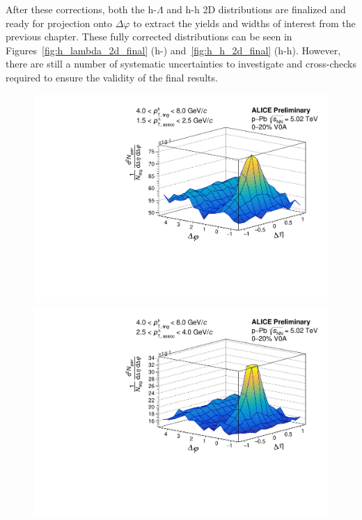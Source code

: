 After these corrections, both the h-$\Lambda$ and h-h 2D distributions are finalized and ready for projection onto $\Delta\varphi$ to extract the yields and widths of interest from the previous chapter. These fully corrected distributions can be seen in Figures~\ref{fig:h_lambda_2d_final} (h-\lmb) and~\ref{fig:h_h_2d_final} (h-h). However, there are still a number of systematic uncertainties to investigate and cross-checks required to ensure the validity of the final results.

\begin{figure}[ht]
	\centering
	\begin{minipage}{0.48\textwidth}
		\includegraphics[width=\textwidth]{figures/analysis/h_lambda_2d_mixcor_fancy_label_0_20_lowpt.pdf}
	\end{minipage}
	\begin{minipage}{0.48\textwidth}
		\includegraphics[width=\textwidth]{figures/analysis/h_lambda_2d_mixcor_fancy_label_0_20_highpt.pdf}

\end{minipage}
\end{figure}
